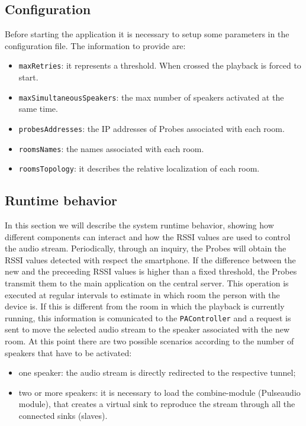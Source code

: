 \documentclass[conference]{IEEEtran}
\begin{document}
\subsection{Configuration}
Before starting the application it is necessary to setup some parameters in the configuration file. The information to provide are:
\begin{itemize}
\item \texttt{maxRetries}: it represents a threshold. When crossed the playback is forced to start.
\item \texttt{maxSimultaneousSpeakers}: the max number of speakers activated at the same time.
\item \texttt{probesAddresses}: the IP addresses of Probes associated with each room.
\item \texttt{roomsNames}: the names associated with each room.
\item \texttt{roomsTopology}: it describes the relative localization of each room. %
\end{itemize}

\subsection{Runtime behavior}
In this section we will describe the system runtime behavior, showing how different components can interact and how the RSSI values are used to control the audio stream.
Periodically, through an inquiry, the Probes will obtain the RSSI values detected with respect the smartphone. If the difference between the new and the preceeding RSSI values is higher than a fixed threshold, the Probes transmit them to the main application on the central server. This operation is executed at regular intervals to estimate in which room the person with the device is. If this is different from the room in which the playback is currently running, this information is comunicated to the \texttt{PAController} and a request is sent to move the selected audio stream to the speaker associated with the new room. At this point there are two possible scenarios according to the number of speakers that have to be activated:
\begin{itemize}
\item one speaker: the audio stream is directly redirected to the respective tunnel;
\item two or more speakers: it is necessary to load the combine-module (Pulseaudio module), that creates a virtual sink to reproduce the stream through all the connected sinks (slaves).
\end{itemize}
\end{document}
